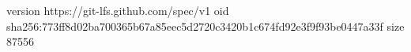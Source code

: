 version https://git-lfs.github.com/spec/v1
oid sha256:773ff8d02ba700365b67a85eec5d2720c3420b1c674fd92e3f9f93be0447a33f
size 87556
